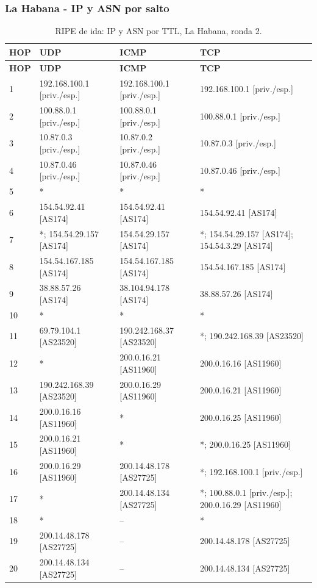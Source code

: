 \subsubsection{La Habana - IP y ASN por salto}
\begingroup
\fontsize{9}{11}\selectfont
\begin{longtable}{p{0.95cm}p{4.716666666666667cm}p{4.716666666666667cm}p{4.716666666666667cm}}
\caption{RIPE de ida: IP y ASN por TTL, La Habana, ronda 2.}\label{ripe:200.14.48.134} \\
\toprule
\textbf{HOP} & \textbf{UDP} & \textbf{ICMP} & \textbf{TCP} \\ \midrule
\endfirsthead
\toprule
\textbf{HOP} & \textbf{UDP} & \textbf{ICMP} & \textbf{TCP} \\ \midrule
\endhead
1 & 192.168.100.1 [priv./esp.] & 192.168.100.1 [priv./esp.] & 192.168.100.1 [priv./esp.] \\
2 & 100.88.0.1 [priv./esp.] & 100.88.0.1 [priv./esp.] & 100.88.0.1 [priv./esp.] \\
3 & 10.87.0.3 [priv./esp.] & 10.87.0.2 [priv./esp.] & 10.87.0.3 [priv./esp.] \\
4 & 10.87.0.46 [priv./esp.] & 10.87.0.46 [priv./esp.] & 10.87.0.46 [priv./esp.] \\
5 & * & * & * \\
6 & 154.54.92.41 [AS174] & 154.54.92.41 [AS174] & 154.54.92.41 [AS174] \\
7 & *; 154.54.29.157 [AS174] & 154.54.29.157 [AS174] & *; 154.54.29.157 [AS174]; 154.54.3.29 [AS174] \\
8 & 154.54.167.185 [AS174] & 154.54.167.185 [AS174] & 154.54.167.185 [AS174] \\
9 & 38.88.57.26 [AS174] & 38.104.94.178 [AS174] & 38.88.57.26 [AS174] \\
10 & * & * & * \\
11 & 69.79.104.1 [AS23520] & 190.242.168.37 [AS23520] & *; 190.242.168.39 [AS23520] \\
12 & * & 200.0.16.21 [AS11960] & 200.0.16.16 [AS11960] \\
13 & 190.242.168.39 [AS23520] & 200.0.16.29 [AS11960] & 200.0.16.21 [AS11960] \\
14 & 200.0.16.16 [AS11960] & * & 200.0.16.25 [AS11960] \\
15 & 200.0.16.21 [AS11960] & * & *; 200.0.16.25 [AS11960] \\
16 & 200.0.16.29 [AS11960] & 200.14.48.178 [AS27725] & *; 192.168.100.1 [priv./esp.] \\
17 & * & 200.14.48.134 [AS27725] & *; 100.88.0.1 [priv./esp.]; 200.0.16.29 [AS11960] \\
18 & * & -- & * \\
19 & 200.14.48.178 [AS27725] & -- & 200.14.48.178 [AS27725] \\
20 & 200.14.48.134 [AS27725] & -- & 200.14.48.134 [AS27725] \\
\bottomrule
\end{longtable}
